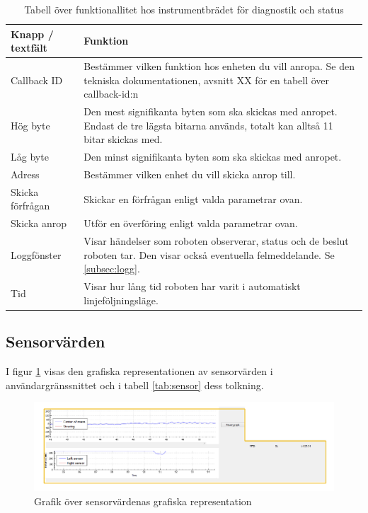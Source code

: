 \documentclass[a4paper,12pt]{article}
\begin{document}
\begin{table}[H]
    \centering
    \begin{tabularx}{\textwidth}{|l|X|}
        \hline \textbf{Knapp / textfält} & \textbf{Funktion} \\ \hline
        Callback ID & Bestämmer vilken funktion hos enheten du vill anropa. Se den tekniska dokumentationen, avsnitt XX för en tabell över callback-id:n \\ \hline
        Hög byte & Den mest signifikanta byten som ska skickas med anropet. Endast de tre lägsta bitarna används, totalt kan alltså 11 bitar skickas med. \\ \hline
        Låg byte & Den minst signifikanta byten som ska skickas med anropet. \\ \hline
        Adress & Bestämmer vilken enhet du vill skicka anrop till. \\ \hline
        Skicka förfrågan & Skickar en förfrågan enligt valda parametrar ovan. \\ \hline
        Skicka anrop & Utför en överföring enligt valda parametrar ovan. \\ \hline
        Loggfönster & Visar händelser som roboten observerar, status och de beslut roboten tar. Den visar också eventuella felmeddelande. Se \ref{subsec:logg}.\\ \hline
        Tid & Visar hur lång tid roboten har varit i automatiskt linjeföljningsläge. \\ \hline
    \end{tabularx}
\caption{Tabell över funktionallitet hos instrumentbrädet för diagnostik och status}
\label{tab:diag}
\end{table}

\subsection{Sensorvärden}
\label{subsec:sensor}
I figur \ref{fig:pc_sensor} visas den grafiska representationen av sensorvärden i användargränssnittet och i tabell \ref{tab:sensor} dess tolkning.

\begin{figure}[H]
	\centering
	\includegraphics[width=1.0\textwidth]{sensor.pdf}
	\caption{Grafik över sensorvärdenas grafiska representation}
	\label{fig:pc_sensor}
\end{figure}
\end{document}
